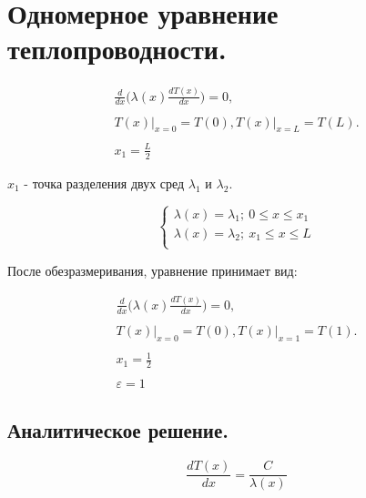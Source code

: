 \documentclass[a4paper,12pt]{article}
\begin{document}
\section{Одномерное уравнение теплопроводности.}

\begin{equation} \label{e1}
    \begin{array}{c}
        \frac{d}{dx} \big( \lambda(x) \frac{dT(x)}{dx} \big) = 0, \\ \\
        \left. T(x) \right|_{x=0} = T(0), \left. T(x) \right|_{x=L} = T(L). \\ \\
        x_1 = \frac{L}{2}
    \end{array} 
\end{equation}

$x_1$ - точка разделения двух сред $\lambda_1$ и $\lambda_2$.

\begin{equation*}
    \begin{cases}
        \lambda(x) = \lambda_1; \ 0 \le x \le x_1\\
        \lambda(x) = \lambda_2; \ x_1 \le x \le L\\
    \end{cases} 
\end{equation*}

После обезразмеривания, уравнение принимает вид:

\begin{equation} \label{e1b}
    \begin{array}{c}
        \frac{d}{dx} \big( \lambda(x) \frac{dT(x)}{dx} \big) = 0, \\ \\
        \left. T(x) \right|_{x=0} = T(0), \left. T(x) \right|_{x=1} = T(1). \\ \\
         x_1 = \frac{1}{2} \\ \\
         \varepsilon = 1
    \end{array} 
\end{equation}

\subsection{Аналитическое решение.}

\begin{equation*}
        \frac{dT(x)}{dx} = \frac{C}{\lambda(x)}
\end{equation*}
\end{document}
